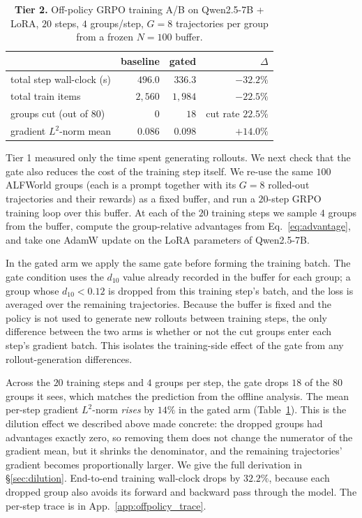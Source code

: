 \documentclass{article}
\begin{document}
\begin{table}[t]
\centering
\caption{\textbf{Tier 2.} Off-policy GRPO training A/B on
Qwen2.5-7B + LoRA, $20$ steps, $4$ groups/step, $G\!=\!8$ trajectories
per group from a frozen $N\!=\!100$ buffer.}
\label{tab:training}
\small
\begin{tabular}{lrrr}
\toprule
& baseline & gated & $\Delta$ \\
\midrule
total step wall-clock (s)   & $496.0$ & $336.3$ & $\mathbf{-32.2\%}$ \\
total train items           & $2{,}560$ & $1{,}984$ & $-22.5\%$ \\
groups cut (out of 80)      & $0$ & $18$ & cut rate $22.5\%$ \\
gradient $L^2$-norm mean    & $0.086$ & $0.098$ & $+14.0\%$ \\
\bottomrule
\end{tabular}
\end{table}

Tier 1 measured only the time spent generating rollouts. We
next check that the gate also reduces the cost of the training
step itself. We re-use the same $100$ ALFWorld groups (each is a
prompt together with its $G = 8$ rolled-out trajectories and
their rewards) as a fixed buffer, and run a $20$-step GRPO
training loop over this buffer. At each of the $20$ training
steps we sample $4$ groups from the buffer, compute the
group-relative advantages from Eq.~\ref{eq:advantage}, and take
one AdamW update on the LoRA parameters of Qwen2.5-7B.

In the gated arm we apply the same gate before forming the
training batch. The gate condition uses the $d_{10}$ value already
recorded in the buffer for each group; a group whose
$d_{10} < 0.12$ is dropped from this training step's batch, and
the loss is averaged over the remaining trajectories. Because
the buffer is fixed and the policy is not used to generate new
rollouts between training steps, the only difference between the
two arms is whether or not the cut groups enter each step's
gradient batch. This isolates the training-side effect of the
gate from any rollout-generation differences.

Across the $20$ training steps and $4$ groups per step, the gate
drops $18$ of the $80$ groups it sees, which matches the
prediction from the offline analysis. The mean per-step gradient
$L^2$-norm \emph{rises} by $14\%$ in the gated arm
(Table~\ref{tab:training}). This is the dilution effect we
described above made concrete: the dropped groups had advantages
exactly zero, so removing them does not change the numerator of
the gradient mean, but it shrinks the denominator, and the
remaining trajectories' gradient becomes proportionally larger.
We give the full derivation in \S\ref{sec:dilution}. End-to-end
training wall-clock drops by $\mathbf{32.2\%}$, because each
dropped group also avoids its forward and backward pass through
the model. The per-step trace is in App.~\ref{app:offpolicy_trace}.
\end{document}

